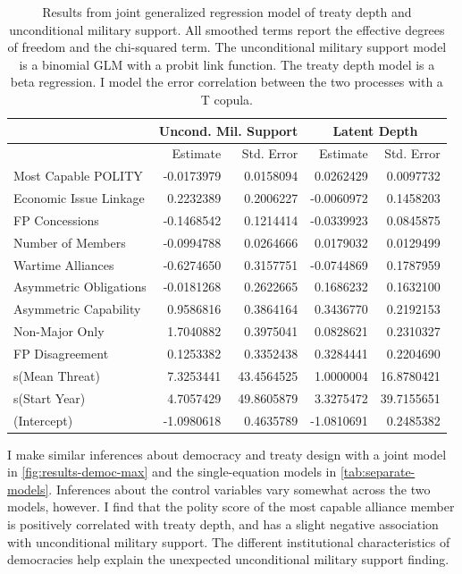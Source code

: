 \documentclass[12pt]{article}
\begin{document}
\begin{table}[ht]
\centering
\begin{tabular}{lrrrr}
  & \multicolumn{2}{c}{Uncond. Mil. Support} & \multicolumn{2}{c}{Latent Depth}\\ \hline
  & Estimate & Std. Error & Estimate & Std. Error \\ 
  \hline
  Most Capable POLITY & -0.0173979 & 0.0158094 & 0.0262429 & 0.0097732 \\ 
  Economic Issue Linkage & 0.2232389 & 0.2006227 & -0.0060972 & 0.1458203 \\ 
  FP Concessions & -0.1468542 & 0.1214414 & -0.0339923 & 0.0845875 \\ 
  Number of Members & -0.0994788 & 0.0264666 & 0.0179032 & 0.0129499 \\ 
  Wartime Alliances & -0.6274650 & 0.3157751 & -0.0744869 & 0.1787959 \\ 
  Asymmetric Obligations & -0.0181268 & 0.2622665 & 0.1686232 & 0.1632100 \\ 
  Asymmetric Capability & 0.9586816 & 0.3864164 & 0.3436770 & 0.2192153 \\ 
  Non-Major Only & 1.7040882 & 0.3975041 & 0.0828621 & 0.2310327 \\ 
  FP Disagreement & 0.1253382 & 0.3352438 & 0.3284441 & 0.2204690 \\ 
  s(Mean Threat) & 7.3253441 & 43.4564525 & 1.0000004 & 16.8780421 \\ 
  s(Start Year) & 4.7057429 & 49.8605879 & 3.3275472 & 39.7155651 \\
  (Intercept) & -1.0980618 & 0.4635789 & -1.0810691 & 0.2485382 \\  
   \hline
\end{tabular}
\caption{Results from joint generalized regression model of treaty depth and unconditional military support. 
                     All smoothed terms report the effective degrees of freedom and the chi-squared term. 
                     The unconditional military support model is a binomial GLM with a probit link function. 
                     The treaty depth model is a beta regression. 
                     I model the error correlation between the two processes with a T copula.} 
\label{tab:gjrm-res}
\end{table} 


I make similar inferences about democracy and treaty design with a joint model in \autoref{fig:results-democ-max} and the single-equation models in \autoref{tab:separate-models}.
Inferences about the control variables vary somewhat across the two models, however. 
I find that the polity score of the most capable alliance member is positively correlated with treaty depth, and has a slight negative association with unconditional military support.
The different institutional characteristics of democracies help explain the unexpected unconditional military support finding. 
\end{document}
